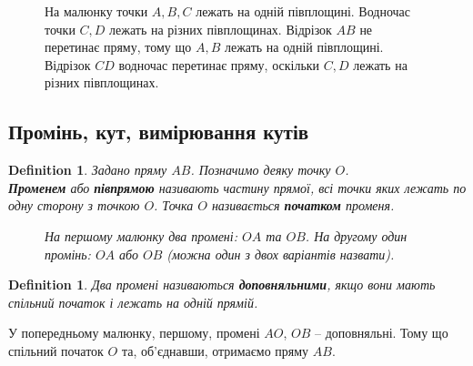 \documentclass[a4paper, 10pt]{article}
\theoremstyle{theoremdd}
\theoremstyle{theoremdd}
\theoremstyle{theoremdd}
\newtheorem{definition}[theorem]{Definition}
\theoremstyle{theoremdd}
\theoremstyle{theoremdd}
\theoremstyle{theoremdd}
\theoremstyle{theoremdd}
\theoremstyle{theoremdd}
\theoremstyle{theoremdd}
\begin{document}
\begin{figure}[H]
\centering
{}
\caption*{На малюнку точки $A,B,C$ лежать на одній півплощині. Водночас точки $C,D$ лежать на різних півплощинах. Відрізок $AB$ не перетинає пряму, тому що $A,B$ лежать на одній півплощині. Відрізок $CD$ водночас перетинає пряму, оскільки $C,D$ лежать на різних півплощинах.}
\end{figure}

\subsection{Промінь, кут, вимірювання кутів}
\begin{definition}
Задано пряму $AB$. Позначимо деяку точку $O$.\\
\textbf{Променем} або \textbf{півпрямою} називають частину прямої, всі точки яких лежать по одну сторону з точкою $O$. Точка $O$ називається \textbf{початком} променя.
\begin{figure}[H]
\centering
{}
\qquad
{}
\caption*{На першому малюнку два промені: $OA$ та $OB$. На другому один промінь: $OA$ або $OB$ (можна один з двох варіантів назвати).}
\end{figure}
\end{definition}

\begin{definition}
Два промені називаються \textbf{доповняльними}, якщо вони мають спільний початок і лежать на одній прямій.
\end{definition}
У попередньому малюнку, першому, промені $AO$, $OB$ -- доповняльні. Тому що спільний початок $O$ та, об'єднавши, отримаємо пряму $AB$.
\end{document}

